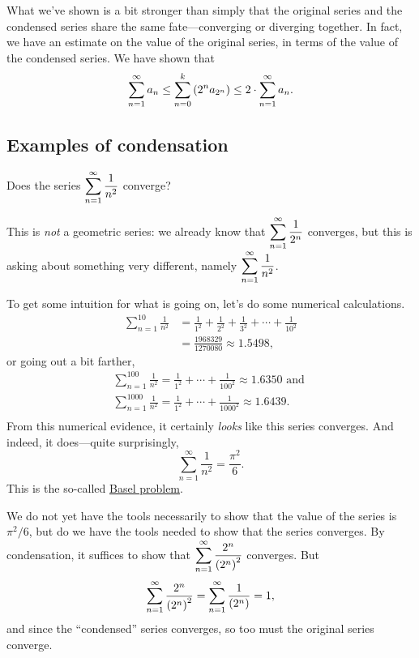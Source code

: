 What we've shown is a bit stronger than simply that the original series and the condensed series share the same fate---converging or diverging together.  In fact, we have an estimate on the value of the original series, in terms of the value of the condensed series.  We have shown that
$$
\sum_{n=1}^\infty a_n \leq \displaystyle\sum_{n=0}^k \left( 2^n a_{2^n} \right) \leq 2 \cdot \sum_{n=1}^\infty a_n.
$$

\subsection{Examples of condensation}

\begin{example}
\label{example:basel-problem}
Does the series $\displaystyle\sum_{n=1}^\infty \displaystyle\frac{1}{n^2}$ converge?
\end{example}

This is \textit{not} a geometric series: we already know that $\displaystyle\sum_{n=1}^\infty \displaystyle\frac{1}{2^n}$ converges, but this is asking about something very different, namely $\displaystyle\sum_{n=1}^\infty \displaystyle\frac{1}{n^2}$.

\begin{solution}
To get some intuition for what is going on, let's do some numerical calculations.
\begin{align*}
\sum_{n=1}^{10} \frac{1}{n^2} &= \frac{1}{1^2} + \frac{1}{2^2} + \frac{1}{3^2} + \cdots + \frac{1}{10^2} \\
&= \frac{1968329}{1270080} \approx 1.5498,
\end{align*}
or going out a bit farther,
\begin{align*}
\sum_{n=1}^{100} \frac{1}{n^2} = \frac{1}{1^2} + \cdots + \frac{1}{100^2} \approx 1.6350 \mbox{ and } \\
\sum_{n=1}^{1000} \frac{1}{n^2} = \frac{1}{1^2} + \cdots + \frac{1}{1000^2} \approx 1.6439. \\
\end{align*}
From this numerical evidence, it certainly \textit{looks} like this
series converges.  And indeed, it does---quite surprisingly,
$$
\sum_{n=1}^{\infty} \frac{1}{n^2} = \frac{\pi^{2}}{6}.
$$
This is the so-called
\href{http://en.wikipedia.org/wiki/Basel_problem}{Basel
  problem}.

We do not yet have the tools necessarily to show that the value of the
series is $\pi^2/6$, but do we have the tools needed to show that the
series converges.  By condensation, it suffices to show that
$\displaystyle\sum_{n=1}^\infty \displaystyle\frac{2^n}{\left( 2^n \right)^2}$ converges.
But
$$
\displaystyle\sum_{n=1}^\infty \displaystyle\frac{2^n}{\left( 2^n \right)^2} = 
\displaystyle\sum_{n=1}^\infty \displaystyle\frac{1}{\left( 2^{n} \right)} = 1,
$$
and since the ``condensed'' series converges, so too must the original series converge.
\end{solution}

